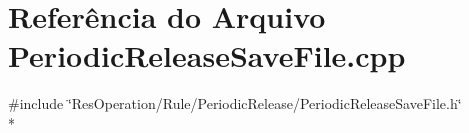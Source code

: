 \section{Referência do Arquivo Periodic\+Release\+Save\+File.\+cpp}
\label{_2_rule_2_periodic_release_2_periodic_release_save_file_8cpp}
{\ttfamily \#include \char`\"{}Res\+Operation/\+Rule/\+Periodic\+Release/\+Periodic\+Release\+Save\+File.\+h\char`\"{}}\\*
